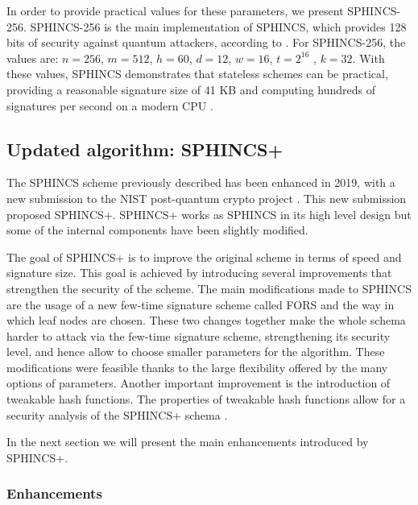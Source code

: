 \documentclass[a4paper,12pt]{article}
\begin{document}
In order to provide practical values for these parameters, we present SPHINCS-256. 
SPHINCS-256 is the main implementation of SPHINCS, which provides 128 bits of security against quantum attackers, according to \cite{1_sphincspaper}.
For SPHINCS-256, the values are: $n = 256$, $m = 512$, $h = 60$, $d = 12$, $w = 16$, $t = 2^{16}$ , $k = 32$.
With these values, SPHINCS demonstrates that stateless schemes can be practical, providing a reasonable signature size of 41 KB and computing hundreds of signatures per second on a modern CPU \cite{7_hashbased}\cite{4_wings}.

\subsection{Updated algorithm: SPHINCS+}
\label{sub:sphincsplus}

The SPHINCS scheme previously described has been enhanced in 2019, with a new submission to the NIST post-quantum crypto project \cite{2_SPHINCS+_round2}. 
This new submission proposed SPHINCS+. SPHINCS+ works as SPHINCS in its high level design but some of the internal components have been slightly modified.

The goal of SPHINCS+ is to improve the original scheme in terms of speed and signature size. This goal is achieved by introducing several improvements that strengthen the security of the scheme. 
The main modifications made to SPHINCS are the usage of a new few-time signature scheme called FORS and the way in which leaf nodes are chosen. These two changes together make the whole schema harder to attack via the few-time signature scheme, strengthening its security level, and hence allow to choose smaller parameters for the algorithm. These modifications were feasible thanks to the large flexibility offered by the many options of parameters.
Another important improvement is the introduction of tweakable hash functions. The properties of tweakable hash functions allow for a security analysis of the SPHINCS+ schema \cite{3_SPHINCS_secondpaper}.

In the next section we will present the main enhancements introduced by SPHINCS+.

\subsubsection{Enhancements}
\end{document}
